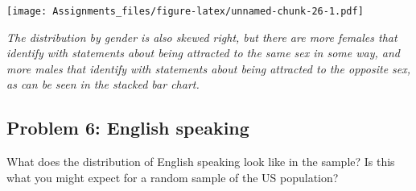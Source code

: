 \documentclass[
]{article}
\newenvironment{Shaded}{\begin{snugshade}}{\end{snugshade}}
\newcommand{\AttributeTok}[1]{\textcolor[rgb]{0.77,0.63,0.00}{#1}}
\newcommand{\CommentTok}[1]{\textcolor[rgb]{0.56,0.35,0.01}{\textit{#1}}}
\newcommand{\ConstantTok}[1]{\textcolor[rgb]{0.00,0.00,0.00}{#1}}
\newcommand{\DecValTok}[1]{\textcolor[rgb]{0.00,0.00,0.81}{#1}}
\newcommand{\FunctionTok}[1]{\textcolor[rgb]{0.00,0.00,0.00}{#1}}
\newcommand{\NormalTok}[1]{#1}
\newcommand{\OtherTok}[1]{\textcolor[rgb]{0.56,0.35,0.01}{#1}}
\newcommand{\SpecialCharTok}[1]{\textcolor[rgb]{0.00,0.00,0.00}{#1}}
\newcommand{\StringTok}[1]{\textcolor[rgb]{0.31,0.60,0.02}{#1}}
\begin{document}
\begin{Shaded}
\end{Shaded}

\texttt{[image: Assignments\_files/figure-latex/unnamed-chunk-26-1.pdf]}

\emph{The distribution by gender is also skewed right, but there are
more females that identify with statements about being attracted to the
same sex in some way, and more males that identify with statements about
being attracted to the opposite sex, as can be seen in the stacked bar
chart.}

\hypertarget{problem-6-english-speaking}{%
\subsection{Problem 6: English
speaking}\label{problem-6-english-speaking}}

What does the distribution of English speaking look like in the sample?
Is this what you might expect for a random sample of the US population?

\begin{Shaded}
\end{Shaded}
\end{document}
